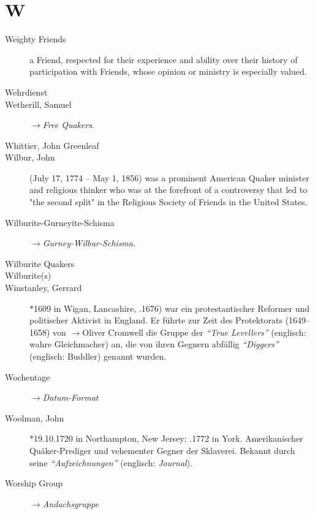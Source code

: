 \section*{W}

\articlesize

\begin{description}
 \item[Weighty Friends]
    a Friend, respected for their experience and ability over their history of participation with Friends, whose opinion or ministry is especially valued.

 
 \item[Wehrdienst]

 \item[Wetherill, Samuel] $\to$\textit{Free Quakers}.

 \item[Whittier, John Greenleaf]

 \item[Wilbur, John] (July 17, 1774 – May 1, 1856) was a prominent American Quaker minister and religious thinker who was at the forefront of a controversy that led to "the second split" in the Religious Society of Friends in the United States.

 \item[Wilburite-Gurneyite-Schisma] $\to$\textit{Gurney-Wilbur-Schisma}.

 \item[Wilburite Quakers]

 \item[Wilburite(s)]

 \item[Winstanley, Gerrard] $\ast$1609 in Wigan, Lancashire, .1676) war ein protestantischer Reformer und politischer Aktivist in England. Er führte zur Zeit des Protektorats (1649–1658) von $\to$Oliver Cromwell die Gruppe der \textit{"`True Levellers"'} (englisch: wahre Gleichmacher) an, die von ihren Gegnern abfällig \textit{"`Diggers"'} (englisch: Buddler) genannt wurden.

\item[Wochentage] $\to$\textit{Datum-Format}

\item[Woolman, John] $\ast$19.10.1720 in Northampton, New Jersey; .1772 in York. Amerikanischer Quäker-Prediger und vehementer Gegner der Sklaverei. Bekannt durch seine \textit{"`Aufzeichnungen"'} (englisch: \textit{Journal}).

\item[Worship Group] $\to$\textit{Andachsgruppe}

 \end{description}


\normalsize